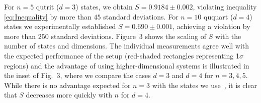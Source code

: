 \documentclass[aps,prl,floatfix,onecolumn,tightenlines,amsmath,amssymb,nofootinbib,12pt]{revtex4-2}
\begin{document}
For $n{=}5$ qutrit ($d{=}3$) states, we obtain $S{=}0.9184\pm 0.002$, violating inequality \eqref{eq:Inequality} by more than $45$ standard deviations.
For $n{=}10$ ququart ($d{=}4$) states we experimentally established $S=0.690\pm0.001$, achieving a violation by more than $250$ standard deviations.
Figure~3 shows the scaling of $S$ with the number of states and dimensions. The individual measurements agree well with the expected performance of the setup (red-shaded rectangles representing 1$\sigma$ regions) and the advantage of using higher-dimensional systems is illustrated in the inset of Fig.~3, where we compare the cases $d{=}3$ and $d{=}4$ for $n{=}3,4,5$. While there is no advantage expected for $n{=}3$ with the states we use~\cite{Branciard2014a}, it is clear that $S$ decreases more quickly with $n$ for $d{=}4$.
\end{document}
